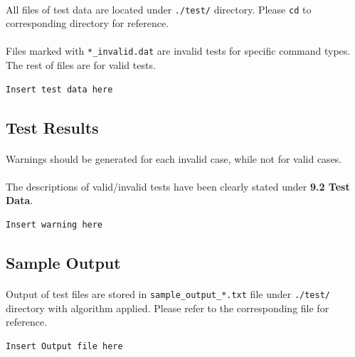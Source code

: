 \documentclass{article}
\begin{document}
            \paragraph{}
                All files of test data are located under \texttt{./test/} directory. Please
                \texttt{cd} to corresponding directory for reference.
            \paragraph{}
                Files marked with \texttt{*\_invalid.dat} are invalid tests for specific command
                types. The rest of files are for valid tests.
            \begin{Verbatim}[gobble=8]
                Insert test data here
            \end{Verbatim}
        \subsection{Test Results}
            \paragraph{}
                Warnings should be generated for each invalid case, while not for valid cases. 
            \paragraph{}
                The descriptions of valid/invalid tests have been clearly stated under
                \textbf{9.2 Test Data}.
            \begin{Verbatim}[gobble=8]
                Insert warning here
            \end{Verbatim}
        \subsection{Sample Output}
            \paragraph{}
                Output of test files are stored in \texttt{sample\_output\_*.txt} file under
                \texttt{./test/} directory with algorithm applied. Please refer to the
                corresponding file for reference.
            \begin{Verbatim}[gobble=8]
                Insert Output file here
            \end{Verbatim}
\end{document}
